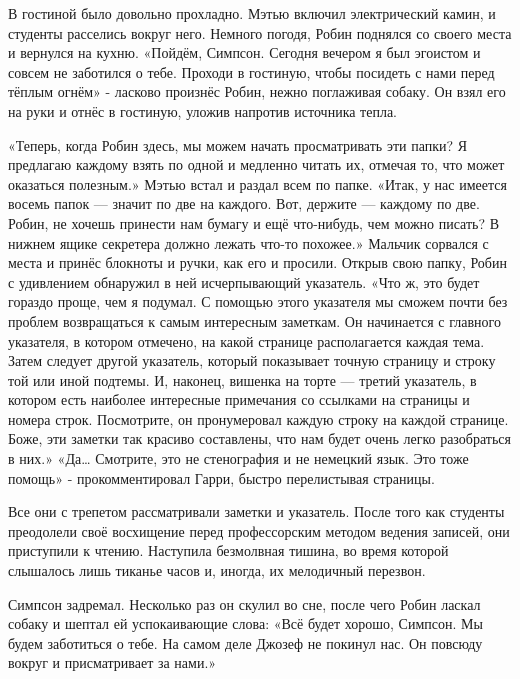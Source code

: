 \documentclass[a4paper,12pt]{book}
\begin{document}
	В гостиной было довольно прохладно. Мэтью включил электрический камин, и студенты расселись вокруг него. Немного погодя, Робин поднялся со своего места и вернулся на кухню.
	«Пойдём, Симпсон. Сегодня вечером я был эгоистом и совсем не заботился о тебе. Проходи в гостиную, чтобы посидеть с нами перед тёплым огнём» - ласково произнёс Робин, нежно поглаживая собаку. Он взял его на руки и отнёс в гостиную, уложив напротив источника тепла.

	«Теперь, когда Робин здесь, мы можем начать просматривать эти папки? Я предлагаю каждому взять по одной и медленно читать их, отмечая то, что может оказаться полезным.»
	Мэтью встал и раздал всем по папке.
	«Итак, у нас имеется восемь папок — значит по две на каждого. Вот, держите — каждому по две. Робин, не хочешь принести нам бумагу и ещё что-нибудь, чем можно писать? В нижнем ящике секретера должно лежать что-то похожее.»
	Мальчик сорвался с места и принёс блокноты и ручки, как его и просили.
	Открыв свою папку, Робин с удивлением обнаружил в ней исчерпывающий указатель.
	«Что ж, это будет гораздо проще, чем я подумал. С помощью этого указателя мы сможем почти без проблем возвращаться к самым интересным заметкам. Он начинается с главного указателя, в котором отмечено, на какой странице располагается каждая тема. Затем следует другой указатель, который показывает точную страницу и строку той или иной подтемы. И, наконец, вишенка на торте — третий указатель, в котором есть наиболее интересные примечания со ссылками на страницы и номера строк. Посмотрите, он пронумеровал каждую строку на каждой странице. Боже, эти заметки так красиво составлены, что нам будет очень легко разобраться в них.»
	«Да… Смотрите, это не стенография и не немецкий язык. Это тоже помощь» - прокомментировал Гарри, быстро перелистывая страницы.

	Все они с трепетом рассматривали заметки и указатель.
	После того как студенты преодолели своё восхищение перед профессорским методом ведения записей, они приступили к чтению. Наступила безмолвная тишина, во время которой слышалось лишь тиканье часов и, иногда, их мелодичный перезвон.

	Симпсон задремал. Несколько раз он скулил во сне, после чего Робин ласкал собаку и шептал ей успокаивающие слова:
	«Всё будет хорошо, Симпсон. Мы будем заботиться о тебе. На самом деле Джозеф не покинул нас. Он повсюду вокруг и присматривает за нами.»
\end{document}
